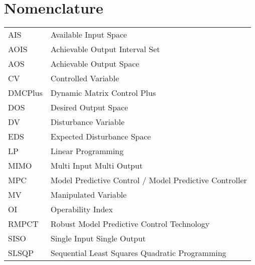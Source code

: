 \maketitle
\makecoverpage

\pagestyle{plain}
\thispagestyle{plain}





\tableofcontents
\newpage
\listoffigures{}
\newpage
\listoftables{}
\newpage
\chapter*{Nomenclature}
\begin{tabular}{ll}
  AIS & Available Input Space \\
  AOIS & Achievable Output Interval Set \citep{limaphd} \\
  AOS & Achievable Output Space \\
  CV  & Controlled Variable \\
  DMCPlus & Dynamic Matrix Control Plus\\
  DOS & Desired Output Space \\
  DV  & Disturbance Variable \\
  EDS & Expected Disturbance Space \\
  LP  & Linear Programming \\
  MIMO & Multi Input Multi Output\\
  MPC & Model Predictive Control / Model Predictive Controller \\
  MV  & Manipulated Variable \\
  OI  & Operability Index \citep{vinsonphd} \\
  RMPCT & Robust Model Predictive Control Technology\\
  SISO & Single Input Single Output\\
  SLSQP & Sequential Least Squares Quadratic Programming \\
\end{tabular}

\newpage

